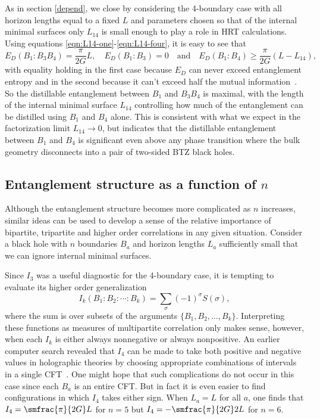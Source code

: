 \documentclass[12pt]{article}
\newcommand{\be}{\begin{equation}}
\newcommand{\ee}{\end{equation}}
\numberwithin{equation}{section}
\begin{document}
As in section \ref{depend}, we close by considering the 4-boundary case with all horizon lengths equal to a fixed $L$ and parameters chosen so that of the internal minimal surfaces only $L_{14}$ is small enough to play a role in HRT calculations. Using equations \eqref{eqn:L14-one}-\eqref{eqn:L14-four}, it is easy to see that
\be
E_D(B_1:B_3 B_4) = \frac{\pi}{2G} L, \quad
E_D(B_1:B_3) = 0\quad \text{and} \quad
E_D(B_1:B_4) \geq \frac{\pi}{2G} ( L - L_{14} ),
\ee
with equality holding in the first case because $E_D$ can never exceed entanglement entropy and in the second because it can't exceed half the mutual information~\cite{christandl2004squashed}. So the distillable entanglement between $B_1$ and $B_3B_4$ is maximal, with the length of the internal minimal surface $L_{14}$ controlling how much of the entanglement can be distilled using $B_1$ and $B_4$ alone.  This is consistent with what we expect in the factorization limit $L_{14} \rightarrow 0$,   but indicates that the distillable entanglement between $B_1$ and $B_4$ is significant even above any phase transition where the bulk geometry disconnects into a pair of two-sided BTZ black holes.

%
\subsection{Entanglement structure as a function of $n$}
%
\label{sec:more-parties}

Although the entanglement structure becomes more complicated as $n$ increases, similar ideas can be used to develop a sense of the relative importance of bipartite, tripartite and higher order correlations in any given situation. Consider a black hole with $n$ boundaries $B_a$ and horizon lengths $L_a$ sufficiently small that we can ignore internal minimal surfaces.

Since $I_3$ was a useful diagnostic for the 4-boundary case, it is tempting to evaluate its
higher order generalization
\be
I_k(B_1: B_2: \cdots : B_k) = \sum_{\sigma} (-1)^\sigma S(\sigma),
\ee
where the sum is over subsets of the arguments $\{ B_1, B_2, \ldots , B_k\}$. Interpreting these functions as measures of multipartite correlation only makes sense, however, when each $I_k$ is either always nonnegative or always nonpositive. An earlier computer search revealed that $I_4$ can be made to take both positive and negative values in holographic theories by choosing appropriate combinations of intervals in a single CFT~\cite{hayden2013holographic}. One might hope that such complications do not occur in this case since each $B_a$ is an entire CFT. But in fact it is even easier to find configurations in which $I_4$ takes either sign. When $L_a = L$ for all $a$, one finds that $I_4 = \smfrac{\pi}{2G} L$ for $n=5$ but $I_4 = - \smfrac{\pi}{2G} 2L$ for $n=6$.
\end{document}
